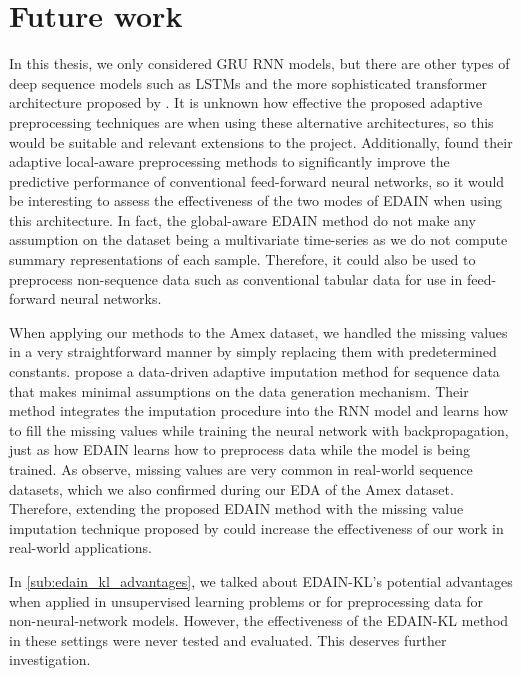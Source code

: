 \documentclass{statsmsc}
\begin{document}
{%

\section{Future work}%
\label{sec:Future work}

In this thesis, we only considered \ac{GRU} \ac{RNN} models, but there are other types of
deep sequence models such as \acp{LSTM} \citep{lstm} and the more 
sophisticated transformer architecture proposed by \cite{attention}. It is unknown how effective
the proposed adaptive preprocessing techniques are when using these alternative architectures, so
this would be suitable and relevant extensions to the project. Additionally, 
\cite{dain,rdain} found their adaptive local-aware preprocessing methods to significantly improve
the predictive performance of conventional feed-forward neural networks, so it would be
interesting to assess the effectiveness of the two modes of \ac{EDAIN} when using this
architecture.
In fact, the global-aware \ac{EDAIN} method do not make any assumption on the
dataset being a multivariate time-series as we do not compute summary representations of each
sample. Therefore, it could also be used to preprocess non-sequence data such as conventional
tabular data for use in  feed-forward neural networks.

When applying our methods to the Amex dataset, we handled the missing values in
a very straightforward manner by simply replacing them with predetermined constants.
\cite{brits} propose a data-driven adaptive imputation method for sequence data
that makes minimal assumptions on the data generation mechanism.  Their method
integrates the imputation procedure into the \ac{RNN} model and learns how to
fill the missing values while training the neural network with backpropagation,
just as how \ac{EDAIN} learns how to preprocess data while the model is being
trained. As \cite{nawi,brits} observe, missing values are very common in
real-world sequence datasets, which we also confirmed during our \ac{EDA} of
the Amex dataset. Therefore, extending the proposed \ac{EDAIN} method with the
missing value imputation technique proposed by \cite{brits} could increase
the effectiveness  of our work in real-world applications.

In  \cref{sub:edain_kl_advantages}, we talked about \ac{EDAIN-KL}'s potential
advantages when applied in unsupervised learning problems or for preprocessing data
for non-neural-network models. However, the effectiveness of the \ac{EDAIN-KL}
method in these settings were never tested and evaluated.
This deserves further investigation.

}
\end{document}
